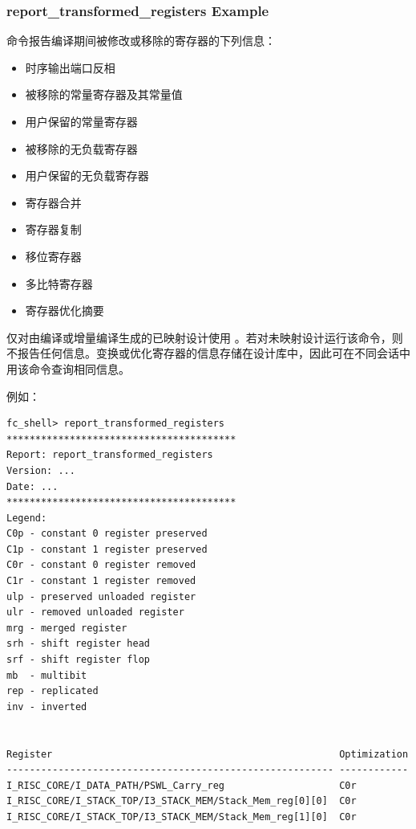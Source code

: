 \subsubsection*{report\_transformed\_registers Example}

 命令报告编译期间被修改或移除的寄存器的下列信息：
\begin{itemize}
  \item 时序输出端口反相
  \item 被移除的常量寄存器及其常量值
  \item 用户保留的常量寄存器
  \item 被移除的无负载寄存器
  \item 用户保留的无负载寄存器
  \item 寄存器合并
  \item 寄存器复制
  \item 移位寄存器
  \item 多比特寄存器
  \item 寄存器优化摘要
\end{itemize}

仅对由编译或增量编译生成的已映射设计使用 。若对未映射设计运行该命令，则不报告任何信息。变换或优化寄存器的信息存储在设计库中，因此可在不同会话中用该命令查询相同信息。

例如：
\begin{lstlisting}
fc_shell> report_transformed_registers
****************************************
Report: report_transformed_registers
Version: ...
Date: ...
****************************************
Legend:
C0p - constant 0 register preserved
C1p - constant 1 register preserved
C0r - constant 0 register removed
C1r - constant 1 register removed
ulp - preserved unloaded register
ulr - removed unloaded register
mrg - merged register
srh - shift register head
srf - shift register flop
mb  - multibit
rep - replicated
inv - inverted


Register                                                  Optimization
--------------------------------------------------------- ------------
I_RISC_CORE/I_DATA_PATH/PSWL_Carry_reg                    C0r
I_RISC_CORE/I_STACK_TOP/I3_STACK_MEM/Stack_Mem_reg[0][0]  C0r
I_RISC_CORE/I_STACK_TOP/I3_STACK_MEM/Stack_Mem_reg[1][0]  C0r
\end{lstlisting}

